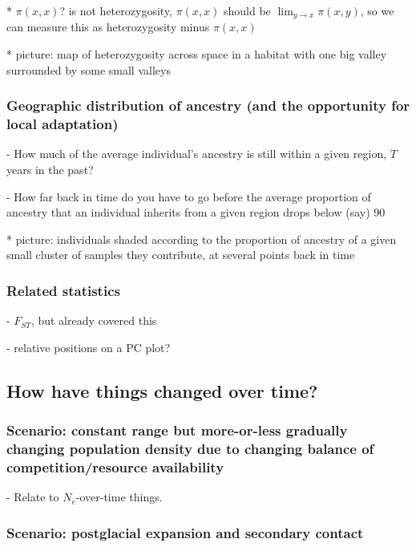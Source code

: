 \documentclass{ar-1col}
\begin{document}
            * $\pi(x,x)$? is not heterozygosity, $\pi(x,x)$ should be $\lim_{y \to x} \pi(x,y)$,
                so we can measure this as heterozygosity minus $\pi(x,x)$

            * picture: map of heterozygosity across space in a habitat with one big valley surrounded by some small valleys


\subsubsection{Geographic distribution of ancestry (and the opportunity for local adaptation)}

        - How much of the average individual's ancestry is still within a given region, $T$ years in the past?

        - How far back in time do you have to go before the average proportion of ancestry that an individual inherits
            from a given region drops below (say) 90%
            
            * picture: individuals shaded according to the proportion of ancestry of a given small cluster of samples
                they contribute, at several points back in time

\subsubsection{Related statistics}

        - $F_{ST}$, but already covered this

        - relative positions on a PC plot?

\subsection{How have things changed over time?}
\subsubsection{Scenario: constant range but more-or-less gradually changing population density due to changing balance of competition/resource availability}

        - Relate to $N_e$-over-time things.

\subsubsection{Scenario: postglacial expansion and secondary contact}
\end{document}
